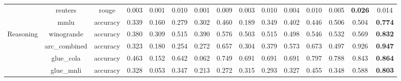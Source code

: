 \begin{landscape}
\begin{table}[ht]
{\begin{tabular}{ccccccccccccccc}
                                   & reuters                        & rouge                            & 0.003              & 0.001             & 0.010                      & 0.001             & 0.009                      & 0.003               & 0.010                    & 0.004               & 0.010                        & 0.005                   & \textbf{0.026}         & 0.014          \\
                                   & mmlu                           & accuracy                         & 0.339              & 0.160             & 0.279                      & 0.302             & 0.460                      & 0.189               & 0.349                    & 0.402               & 0.446                        & 0.506                   & 0.504                  & \textbf{0.774} \\
\midrule
\multirow{13}{*}{Reasoning}        & winogrande                     & accuracy                         & 0.380              & 0.309             & 0.515                      & 0.390             & 0.576                      & 0.503               & 0.515                    & 0.498               & 0.546                        & 0.532                   & 0.569                  & \textbf{0.832} \\
                                   & arc\_combined                  & accuracy                         & 0.323              & 0.180             & 0.254                      & 0.272             & 0.657                      & 0.304               & 0.379                    & 0.573               & 0.673                        & 0.497                   & 0.926                  & \textbf{0.947} \\
                                   & glue\_cola                     & accuracy                         & 0.463              & 0.152             & 0.642                      & 0.062             & 0.749                      & 0.691               & 0.691                    & 0.691               & 0.797                        & 0.788                   & 0.843                  & \textbf{0.864} \\
                                   & glue\_mnli                     & accuracy                         & 0.328              & 0.053             & 0.347                      & 0.213             & 0.272                      & 0.315               & 0.293                    & 0.327               & 0.455                        & 0.348                   & 0.588                  & \textbf{0.803} \\

\end{tabular}}
\end{table}
\end{landscape}
